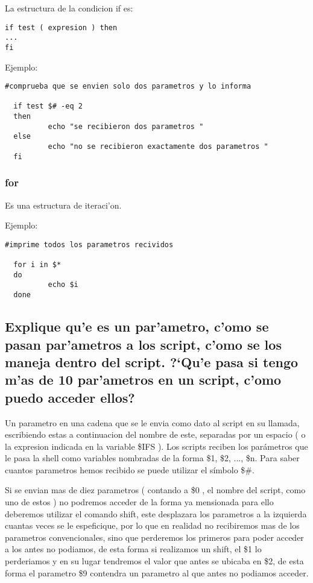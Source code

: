 \documentclass[a4paper,11pt]{article}
\newcommand{\?}{?`}
\begin{document}
La estructura de la condicion if es:
\begin{lstlisting}
if test ( expresion ) then
...
fi
\end{lstlisting}

Ejemplo:

\begin{lstlisting}
#comprueba que se envien solo dos parametros y lo informa

  if test $# -eq 2
  then
          echo "se recibieron dos parametros "
  else
          echo "no se recibieron exactamente dos parametros "
  fi
\end{lstlisting}

\subsubsection{for}
Es una estructura de iteraci'on.

Ejemplo:

\begin{lstlisting}
#imprime todos los parametros recividos

  for i in $*
  do
          echo $i
  done
\end{lstlisting}



\subsection[Punto H]{Explique qu'e es un par'ametro, c'omo se pasan par'ametros a los script, c'omo se
los maneja dentro del script. \?Qu'e pasa si tengo m'as de 10 par'ametros en un script, c'omo
puedo acceder ellos?}

Un parametro en una cadena que se le envia como dato al script en su llamada, escribiendo estas a continuacion del nombre 
de este, separadas por un espacio ( o la expresion indicada en la variable \$IFS ).
Los scripts reciben los parámetros que le pasa la shell como variables nombradas de la forma \$1, \$2, ..., \$n. 
Para saber cuantos parametros hemos recibido se puede utilizar el símbolo \$\#.

Si se envian mas de diez parametros ( contando a \$0 , el nombre del script, como uno de estos ) no podremos acceder de la forma 
ya mensionada para ello deberemos utilizar el comando shift, este desplazara los parametros a la izquierda cuantas veces se 
le espeficique, por lo que en realidad no recibiremos mas de los parametros convencionales, sino que perderemos los primeros para poder 
acceder a los antes no podiamos, de esta forma si realizamos un shift, el \$1 lo perderiamos y en su lugar tendremos el 
valor que antes se ubicaba en \$2, de esta forma el parametro \$9 contendra un parametro al que antes no podiamos acceder.
\end{document}

